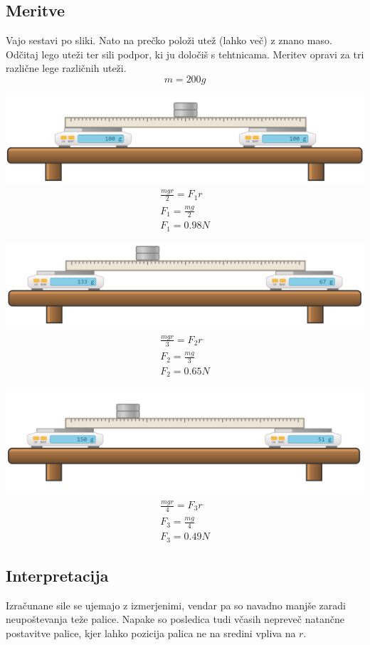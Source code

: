 \documentclass[a4paper]{article}
\begin{document}
\subsection*{Meritve}
Vajo sestavi po sliki. Nato na prečko položi utež (lahko več) z znano maso. Odčitaj lego uteži ter sili podpor, ki ju določiš s tehtnicama. Meritev opravi za tri različne lege različnih uteži.
\begin{equation}
   m = 200g
\end{equation}
\begin{center}
\includegraphics[scale=0.4]{primer1.png}
\begin{gather}
   \frac{m g r}{2} = F_1 r \\
   F_1 = \frac{mg}{2} \\
   F_1 = 0.98N
\end{gather}
\end{center}
\begin{center}
   \includegraphics[scale=0.4]{primer2.png}
   \begin{gather}
      \frac{m g r}{3} = F_2 r \\
      F_2 = \frac{mg}{3} \\
      F_2 = 0.65N
   \end{gather}
\end{center}
\begin{center}
   \includegraphics[scale=0.4]{primer3.png}
   \begin{gather}
      \frac{m g r}{4} = F_3 r \\
      F_3 = \frac{mg}{4} \\
      F_3 = 0.49N
   \end{gather}
\end{center}
\subsection*{Interpretacija}
Izračunane sile se ujemajo z izmerjenimi, vendar pa so navadno manjše zaradi neupoštevanja teže palice. Napake so posledica tudi včasih nepreveč natančne postavitve palice, kjer lahko pozicija palica ne na sredini vpliva na $r$.
\end{document}

